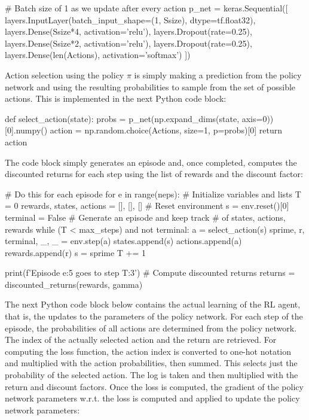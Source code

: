 \begin{pythoncode}
# Batch size of 1 as we update after every action
p_net = keras.Sequential([
    layers.InputLayer(batch_input_shape=(1, Ssize), dtype=tf.float32),
    layers.Dense(Ssize*4, activation='relu'),
    layers.Dropout(rate=0.25),
    layers.Dense(Ssize*2, activation='relu'),
    layers.Dropout(rate=0.25),
    layers.Dense(len(Actions), activation='softmax')
])
\end{pythoncode}

Action selection using the policy $\pi$ is simply making a prediction from the policy network and using the resulting probabilities to sample from the set of possible actions. This is implemented in the next Python code block:

\begin{pythoncode}
def select_action(state):
    probs = p_net(np.expand_dims(state, axis=0))[0].numpy()
    action = np.random.choice(Actions, size=1, p=probs)[0]
    return action
\end{pythoncode}

The code block simply generates an episode and, once completed, computes the discounted returns for each step using the list of rewards and the discount factor:

\begin{pythoncode}
# Do this for each episode
for e in range(neps):
    # Initialize variables and lists
    T = 0
    rewards, states, actions = [], [], []
    # Reset environment
    s = env.reset()[0]
    terminal = False
    # Generate an episode and keep track
    # of states, actions, rewards
    while (T < max_steps) and not terminal:
        a = select_action(s)
        sprime, r, terminal, _, _ = env.step(a)
        states.append(s)
        actions.append(a)
        rewards.append(r)
        s = sprime
        T += 1

    print(f'Episode {e:5} goes to step {T:3}')
    # Compute discounted returns
    returns = discounted_returns(rewards, gamma)
\end{pythoncode}

The next Python code block below contains the actual learning of the RL agent, that is, the updates to the parameters of the policy network. For each step of the episode, the probabilities of all actions are determined from the policy network. The index of the actually selected action and the return are retrieved. For computing the loss function, the action index is converted to one-hot notation and multiplied with the action probabilities, then summed. This selects just the probability of the selected action. The log is taken and then multiplied with the return and discount factors. Once the loss is computed, the gradient of the policy network parameters w.r.t. the loss is computed and applied to update the policy network parameters:


